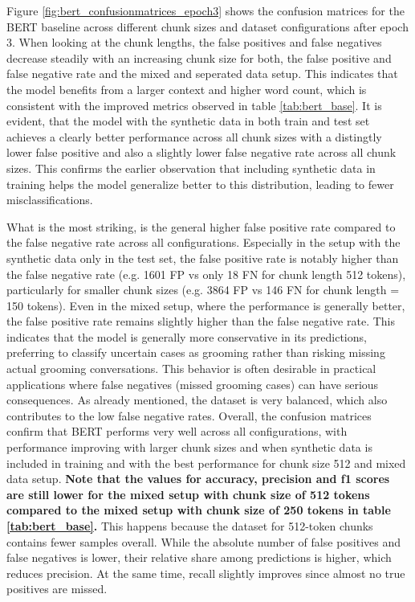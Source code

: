 Figure \ref{fig:bert_confusionmatrices_epoch3} shows the confusion matrices for the BERT baseline across different chunk sizes and dataset configurations after epoch 3. When looking at the chunk lengths, the false positives and false negatives decrease steadily with an increasing chunk size for both, the false positive and false negative rate and the mixed and seperated data setup. This indicates that the model benefits from a larger context and higher word count, which is consistent with the improved metrics observed in table \ref{tab:bert_base}. It is evident, that the model with the synthetic data in both train and test set achieves a clearly better performance across all chunk sizes with a distingtly lower false positive and also a slightly lower false negative rate across all chunk sizes. This confirms the earlier observation that including synthetic data in training helps the model generalize better to this distribution, leading to fewer misclassifications. 

What is the most striking, is the general higher false positive rate compared to the false negative rate across all configurations. Especially in the setup with the synthetic data only in the test set, the false positive rate is notably higher than the false negative rate (e.g. 1601 FP vs only 18 FN for chunk length 512 tokens), particularly for smaller chunk sizes (e.g. 3864 FP vs 146 FN for chunk length = 150 tokens). Even in the mixed setup, where the performance is generally better, the false positive rate remains slightly higher than the false negative rate. This indicates that the model is generally more conservative in its predictions, preferring to classify uncertain cases as grooming rather than risking missing actual grooming conversations. This behavior is often desirable in practical applications where false negatives (missed grooming cases) can have serious consequences. As already mentioned, the dataset is very balanced, which also contributes to the low false negative rates. Overall, the confusion matrices confirm that BERT performs very well across all configurations, with performance improving with larger chunk sizes and when synthetic data is included in training and with the best performance for chunk size 512 and mixed data setup. \textbf{Note that the values for accuracy, precision and f1 scores are still lower for the mixed setup with chunk size of 512 tokens compared to the mixed setup with chunk size of 250 tokens in table \ref{tab:bert_base}.} This happens because the dataset for 512-token chunks contains fewer samples overall. While the absolute number of false positives and false negatives is lower, their relative share among predictions is higher, which reduces precision. At the same time, recall slightly improves since almost no true positives are missed.


